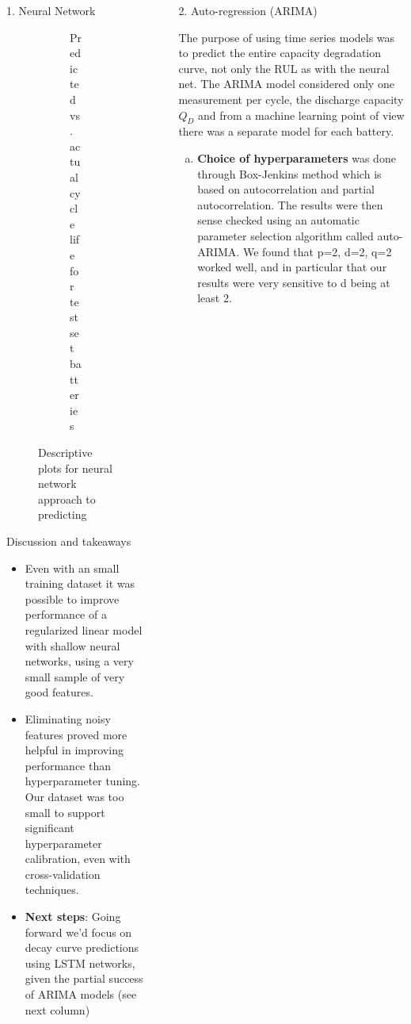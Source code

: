 \documentclass[final]{beamer}
\newlength{\sepwidth}
\newlength{\colwidth}
\newcommand{\separatorcolumn}{\begin{column}{\sepwidth}\end{column}}
\begin{document}
\begin{frame}[t]
\begin{columns}[t]
\begin{column}{\colwidth}
\begin{block}{1. Neural Network}
\begin{figure}[H]
\begin{subfigure}[b]{0.49\textwidth}
         \caption{Predicted vs. actual cycle life for test set batteries}
     \end{subfigure}
\caption{Descriptive plots for neural network approach to predicting} %
\label{fig:birds}
\end{figure} 

  \end{block}

\begin{alertblock}{\small Discussion and takeaways}

\begin{itemize}

 \item Even with an small training dataset it was possible to improve performance of a regularized linear model with shallow neural networks, using a very small sample of very good features.
 \item Eliminating noisy features proved more helpful in improving performance than hyperparameter tuning. Our dataset was too small to support significant hyperparameter calibration, even with cross-validation techniques. 
 \item \textbf{Next steps}: Going forward we'd focus on decay curve predictions using LSTM networks, given the partial success of ARIMA models (see next column)

\end{itemize}

\end{alertblock}

\end{column}

\separatorcolumn

\begin{column}{\colwidth}

  \begin{block}{2. Auto-regression (ARIMA)}

    The purpose of using time series models was to predict the entire capacity degradation curve, not only the RUL as with the neural net. The ARIMA model considered only one measurement per cycle, the discharge capacity $Q_D$ and from a machine learning point of view there was a separate model for each battery. 
    
    \begin{enumerate}[(a)]%
      \item \textbf{Choice of hyperparameters} was done through Box-Jenkins method which is based on autocorrelation and partial autocorrelation. The results were then sense checked using an automatic parameter selection algorithm called auto-ARIMA. We found that p=2, d=2, q=2 worked well, and in particular that our results were very sensitive to d being at least 2.
      

\end{enumerate}
\end{block}
\end{column}
\end{columns}
\end{frame}
\end{document}
